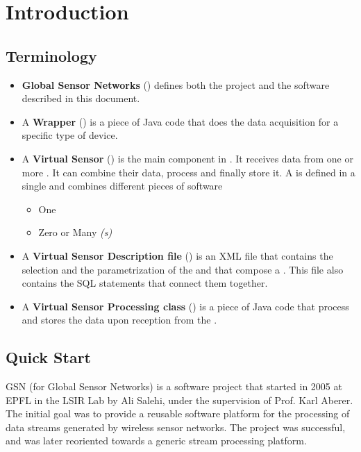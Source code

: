 \chapter{Introduction}

\section{Terminology}

\begin{itemize}
	\item \textbf{Global Sensor Networks} (\gsn) defines both the project and the software described in this document. \\
	\item A \textbf{Wrapper} (\wrapper) is a piece of Java code that does the data acquisition for a specific type of device. \\
	\item A \textbf{Virtual Sensor} (\vs) is the main component in \gsn. It receives data from one or more \wrapper. It can combine their data, 
		process and finally store it. A \vs is defined in a single \vsd and combines different pieces of software 
	\begin{itemize}
		\item One \vsp
		\item Zero or Many \wrapper\textit{(s)}
	\end{itemize}
	\item A \textbf{Virtual Sensor Description file} (\vsd) is an XML file that contains the selection and the parametrization of the \vsp and \wrapper that compose a \vs.
		This file also contains the SQL statements that connect them together. \\
	\item A \textbf{Virtual Sensor Processing class} (\vsp) is a piece of Java code that process and stores the data upon reception from the \wrapper. \\
\end{itemize}

\section{Quick Start}

GSN (for Global Sensor Networks) is a software project that started in
2005 at EPFL in the LSIR Lab by Ali Salehi, under the supervision of
Prof. Karl Aberer. The initial goal was to provide a reusable software
platform for the processing of data streams generated by wireless
sensor networks. The project was successful, and was later reoriented
towards a generic stream processing platform.

